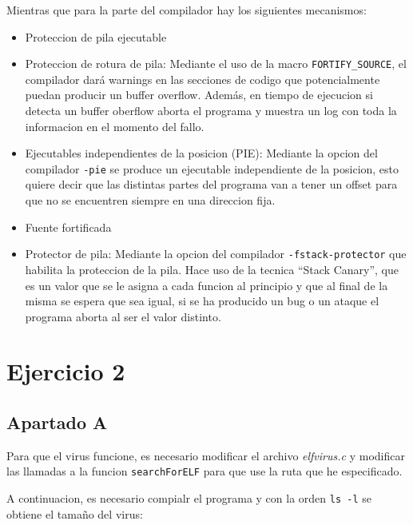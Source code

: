 \documentclass{article}
\begin{document}
Mientras que para la parte del compilador hay los siguientes mecanismos:

\begin{itemize}
    \item Proteccion de pila ejecutable
    \item Proteccion de rotura de pila: Mediante el uso de la macro \verb|FORTIFY_SOURCE|, el compilador dará warnings en las secciones de codigo que potencialmente puedan producir un buffer overflow. Además, en tiempo de ejecucion si detecta un buffer oberflow aborta el programa y muestra un log con toda la informacion en el momento del fallo.
    \item Ejecutables independientes de la posicion (PIE): Mediante la opcion del compilador \verb|-pie| se produce un ejecutable independiente de la posicion, esto quiere decir que las distintas partes del programa van a tener un offset para que no se encuentren siempre en una direccion fija.
    \item Fuente fortificada
    \item Protector de pila: Mediante la opcion del compilador \verb|-fstack-protector| que habilita la proteccion de la pila. Hace uso de la tecnica ``Stack Canary'', que es un valor que se le asigna a cada funcion al principio y que al final de la misma se espera que sea igual, si se ha producido un bug o un ataque el programa aborta al ser el valor distinto.
\end{itemize}

\section*{Ejercicio 2}

\subsection*{Apartado A}

Para que el virus funcione, es necesario modificar el archivo \textit{elfvirus.c} y modificar las llamadas a la funcion \verb|searchForELF| para que use la ruta que he especificado.


A continuacion, es necesario compialr el programa y con la orden \verb|ls -l| se obtiene el tamaño del virus:

\end{document}
